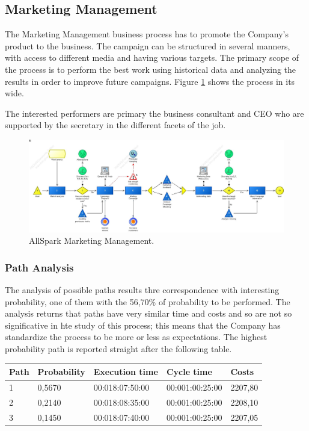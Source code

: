 %

\subsection{Marketing Management}
The Marketing Management business process has to promote the Company's product to the business. The campaign can be structured in several manners, with access to different media and having various targets. The primary scope of the process is to perform the best work using historical data and analyzing the results in order to improve future campaigns. Figure \ref{2img:mark_man} shows the process in its wide.

The interested performers are primary the business consultant and CEO who are supported by the secretary in the different facets of the job.

\begin{figure}[ht!]
\begin{centering}
\includegraphics[scale=0.50, angle=90]{assign2/adonis/imgs/mark_man.jpg}
\caption{AllSpark Marketing Management.}
\label{2img:mark_man}
\end{centering}
\end{figure}


\subsubsection{Path Analysis}
The analysis of possible paths results thre correspondence with interesting probability, one of them with the 56,70\% of probability to be performed. The analysis returns that paths have very similar time and costs and so are not so significative in hte study of this process; this means that the Company has standardize the process to be more or less as expectations. The highest probability path is reported straight after the following table.

\begin{table}
\centering
\begin{tabular}{|l|l|l|l|l|}
Path&Probability&Execution time&Cycle time&Costs\\
\hline
1&0,5670&00:018:07:50:00&00:001:00:25:00&2207,80\\
\hline
2&0,2140&00:018:08:35:00&00:001:00:25:00&2208,10\\
\hline
3&0,1450&00:018:07:40:00&00:001:00:25:00&2207,05
\end{tabular}
\end{table}

